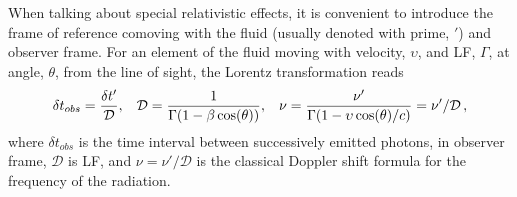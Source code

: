 When talking about special relativistic effects, it is convenient 
to introduce the frame of reference comoving with the fluid (usually denoted with prime, $'$) 
and observer frame. 
For an element of the fluid moving with velocity, $\upsilon$, and \ac{LF}, 
$\Gamma$, at angle, $\theta$, from the line of sight, the Lorentz transformation 
reads 
%
\begin{equation}
\delta t_{obs} = \frac{\delta t'}{\mathcal{D}}, \hspace{3mm}
\mathcal{D} = \frac{1}{\Gamma(1 - \beta\cos(\theta))}, \hspace{3mm}
\nu = \frac{\nu'}{\Gamma (1 - \upsilon\cos(\theta)/c)} = \nu' / \mathcal{D}\, ,
\label{eq:afterglow:dop_fac}
\end{equation}
%
where $\delta t_{obs}$ is the time interval between successively emitted photons, 
in observer frame, $\mathcal{D}$ is \ac{LF}, and $\nu=\nu'/\mathcal{D}$ is the 
classical Doppler shift formula for the frequency of the radiation.

%
%
%
%

